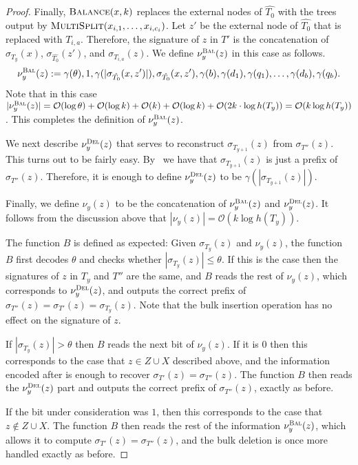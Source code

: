 \documentclass[kpfonts]{patmorin}
\newcommand{\Oh}{\mathcal{O}}
\let\leq\leqslant
\begin{document}
\begin{proof}
  Finally, $\textsc{Balance}(x,k)$ replaces the external nodes of $\hat{T_0}$ with the trees output by $\textsc{MultiSplit}(x_{i,1},\ldots,x_{i,c_i})$.
  Let $z'$ be the external node of $\hat{T_0}$ that is replaced with $T_{i,a}$.
  Therefore, the signature of $z$ in $T'$ is the concatenation of $\sigma_{T_y}(x)$, $\sigma_{\hat{T_0}}(z')$, and $\sigma_{T_{i,a}}(z)$.
  We define $\nu^{\textsc{Bal}}_y(z)$ in this case as follows.
    \[
  \nu^{\textsc{Bal}}_y(z) := \gamma(\theta),1,\gamma(|\sigma_{\hat{T_0}}(x,z')|),\sigma_{\hat{T_0}}(x,z'),\gamma(b),
  \gamma(d_1),\gamma(q_1),\ldots,\gamma(d_b),\gamma(q_b).
  \]
  Note that in this case $|\nu^{\textsc{Bal}}_y(z)|=\Oh(\log\theta) + \Oh(\log k) + \Oh(k) + \Oh(\log k) + \Oh(2k\cdot\log h(T_y))=\Oh(k\log h(T_y))$.
  This completes the definition of $\nu^{\textsc{Bal}}_y(z)$.

  We next describe $\nu^{\textsc{Del}}_y(z)$ that serves to reconstruct $\sigma_{T_{y+1}}(z)$ from $\sigma_{T''}(z)$.
  This turns out to be fairly easy.
  By~ we have that $\sigma_{T_{y+1}}(z)$ is just a prefix of $\sigma_{T''}(z)$.
  Therefore, it is enough to define $\nu^{\textsc{Del}}_y(z)$ to be $\gamma(|\sigma_{T_{y+1}}(z)|)$.

  Finally, we define $\nu_y(z)$ to be the concatenation of $\nu^{\textsc{Bal}}_y(z)$ and $\nu^{\textsc{Del}}_y(z)$.
  It follows from the discussion above that $|\nu_y(z)| = \Oh(k\log h(T_y))$.

  The function $B$ is defined as expected:
  Given $\sigma_{T_{y}}(z)$ and $\nu_y(z)$, the function $B$ first decodes $\theta$ and checks whether $|\sigma_{T_y}(z)| \leq \theta$. If this is the case then the signatures of $z$ in $T_{y}$ and $T''$ are the same, and $B$ reads the rest of $\nu_y(z)$, which corresponds to $\nu^{\textsc{Del}}_y(z)$, and outputs the correct prefix of $\sigma_{T''}(z) = \sigma_{T'}(z) =\sigma_{T_{y}}(z)$.
  Note that the bulk insertion operation has no effect on the signature of $z$.

  If $|\sigma_{T_y}(z)| > \theta$ then $B$ reads the next bit of $\nu_y(z)$. If it is $0$ then this corresponds to the case that $z\in Z\cup X$ described above, and the information encoded after is enough to recover  $\sigma_{T'}(z)=\sigma_{T''}(z)$. The function $B$ then reads the $\nu^{\textsc{Del}}_y(z)$ part and outputs the correct prefix of $\sigma_{T''}(z)$, exactly as before.

  If the bit under consideration was $1$, then this corresponds to the case that $z\not\in Z\cup X$. The function $B$ then reads the rest of the information $\nu^{\textsc{Bal}}_y(z)$, which allows it to compute $\sigma_{T'}(z)=\sigma_{T''}(z)$, and the bulk deletion is once more handled exactly as before.
\end{proof}
\end{document}
